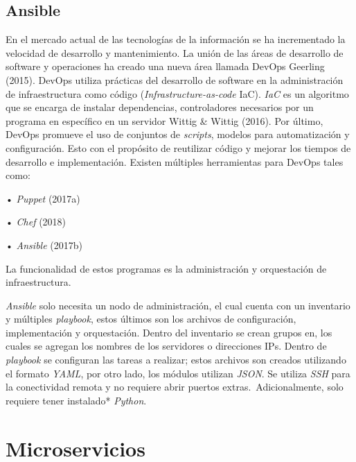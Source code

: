 \documentclass[12pt,twoside]{reedthesis}
\begin{document}
\hypertarget{ansible}{%
\subsection{Ansible}\label{ansible}}

En el mercado actual de las tecnologías de la información se ha incrementado la velocidad de desarrollo y mantenimiento.
La unión de las áreas de desarrollo de software y operaciones ha creado una nueva área llamada DevOps Geerling (2015). DevOps utiliza prácticas del desarrollo de software en la administración de infraestructura como código (\emph{Infrastructure-as-code} IaC). \emph{IaC} es un algoritmo que se encarga de instalar dependencias, controladores necesarios por un programa en específico en un servidor Wittig \& Wittig (2016). Por último, DevOps promueve el uso de conjuntos de \emph{scripts}, modelos para automatización y configuración. Esto con el propósito de reutilizar código y mejorar los tiempos de desarrollo e implementación. Existen múltiples herramientas para DevOps tales como:~

• \emph{Puppet} (2017a)~

• \emph{Chef} (2018)~

• \emph{Ansible} (2017b)

La funcionalidad de estos programas es la administración y orquestación de infraestructura.

\emph{Ansible} solo necesita un nodo de administración, el cual cuenta con un inventario y múltiples \emph{playbook}, estos últimos son los archivos de configuración, implementación y orquestación. Dentro del inventario se crean grupos en, los cuales se agregan los nombres de los servidores o direcciones IPs. Dentro de \emph{playbook} se configuran las tareas a realizar; estos archivos son creados utilizando el formato \emph{YAML}, por otro lado, los módulos utilizan \emph{JSON}. Se utiliza \emph{SSH} para la conectividad remota y no requiere abrir puertos extras.~Adicionalmente, solo requiere tener instalado* \emph{Python}.

\hypertarget{microservicios}{%
\section{Microservicios}\label{microservicios}}
\end{document}

